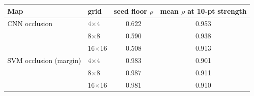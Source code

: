 \begin{tabular}{@{}llcc@{}}\toprule
Map & grid & seed floor $\rho$ & mean $\rho$ at 10-pt strength\\\midrule
CNN occlusion & 4$\times$4 & 0.622 & 0.953 \\
 & 8$\times$8 & 0.590 & 0.938 \\
 & 16$\times$16 & 0.508 & 0.913 \\
SVM occlusion (margin) & 4$\times$4 & 0.983 & 0.901 \\
 & 8$\times$8 & 0.987 & 0.911 \\
 & 16$\times$16 & 0.981 & 0.910 \\
\bottomrule\end{tabular}
